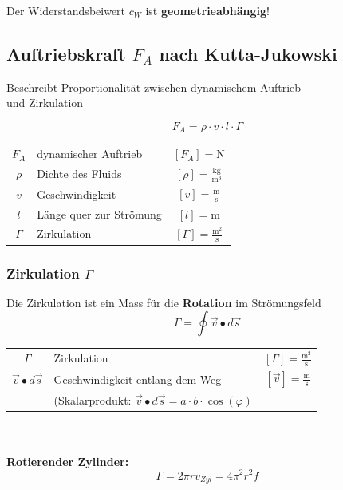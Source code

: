 Der Widerstandsbeiwert $c_W$ ist \textbf{geometrieabhängig}!






\subsection{Auftriebskraft $F_A$ nach Kutta-Jukowski}
Beschreibt Proportionalität zwischen dynamischem Auftrieb \\
und Zirkulation 

$$ \boxed{ F_A = \rho \cdot v \cdot l \cdot \Gamma } $$

\begin{tabular}{c l c}
		$F_A$ & dynamischer Auftrieb & $[F_A] = \mathrm{N}$ \\
		\rule{0pt}{8pt}$\rho$ & Dichte des Fluids & $[\rho] = \mathrm{\frac{kg}{m^3}}$ \\
		\rule{0pt}{8pt}$v$ & Geschwindigkeit & $[v] = \mathrm{\frac{m}{s}}$ \\
		$l$ & Länge quer zur Strömung & $[l] = \mathrm{m}$ \\
		\rule{0pt}{8pt}$\Gamma$ & Zirkulation & $[\Gamma] = \mathrm{\frac{m^2}{s}}$ \\
\end{tabular}






\subsubsection{Zirkulation $\Gamma$}
Die Zirkulation ist ein Mass für die \textbf{Rotation} im Strömungsfeld \\

$$ \boxed{ \Gamma = 	\oint \vec{v} \bullet d\vec{s} } $$


\begin{tabular}{c l c}
		\rule{0pt}{8pt}$\Gamma$ & Zirkulation & $[\Gamma] = \mathrm{\frac{m^2}{s}}$ \\
		\rule{0pt}{8pt}$\vec{v} \bullet d\vec{s}$ & Geschwindigkeit entlang dem Weg & $[\vec{v}] = \mathrm{\frac{m}{s}}$  \\
		& (Skalarprodukt: $\vec{v} \bullet d\vec{s} = a \cdot b \cdot \cos(\varphi)$ & \\
\end{tabular} \\
\\
\textbf{Rotierender Zylinder:} $$ \boxed{ \Gamma = 2\pi r v_{Zyl} = 4\pi^2r^2f } $$


